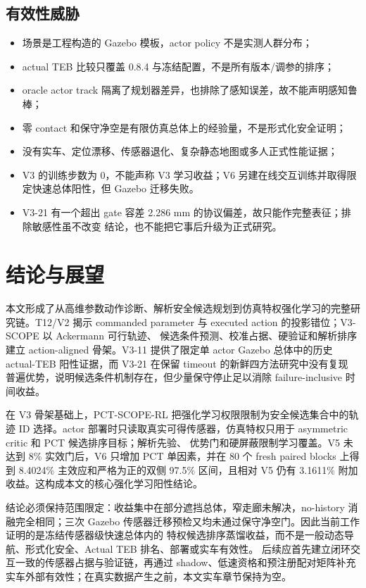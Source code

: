 \documentclass[12pt,a4paper,oneside]{report}
\begin{document}
\section{有效性威胁}
\begin{itemize}
  \item 场景是工程构造的 Gazebo 模板，actor policy 不是实测人群分布；
  \item actual TEB 比较只覆盖 0.8.4 与冻结配置，不是所有版本/调参的排序；
  \item oracle actor track 隔离了规划器差异，也排除了感知误差，故不能声明感知鲁棒；
  \item 零 contact 和保守净空是有限仿真总体上的经验量，不是形式化安全证明；
  \item 没有实车、定位漂移、传感器退化、复杂静态地图或多人正式性能证据；
  \item V3 的训练步数为 0，不能声称 V3 学习收益；V6 另建在线交互训练并取得限定快速总体阳性，但 Gazebo 迁移失败。
  \item V3-21 有一个超出 gate 容差 2.286 mm 的协议偏差，故只能作完整表征；排除敏感性虽不改变
  结论，也不能把它事后升级为正式研究。
\end{itemize}

\chapter{结论与展望}
本文形成了从高维参数动作诊断、解析安全候选规划到仿真特权强化学习的完整研究链。T12/V2
揭示 commanded parameter 与 executed action 的投影错位；V3-SCOPE 以 Ackermann 可行轨迹、
候选条件预测、校准占据、硬验证和解析排序建立 action-aligned 骨架。V3-11 提供了限定单 actor
Gazebo 总体中的历史 actual-TEB 阳性证据，而 V3-21 在保留 timeout 的新鲜四方法研究中没有复现
普遍优势，说明候选条件机制存在，但少量保守停止足以消除 failure-inclusive 时间收益。

在 V3 骨架基础上，PCT-SCOPE-RL 把强化学习权限限制为安全候选集合中的轨迹 ID 选择。actor
部署时只读取真实可得传感器，仿真特权只用于 asymmetric critic 和 PCT 候选排序目标；解析先验、
优势门和硬屏蔽限制学习覆盖。V5 未达到 8\% 实效门后，V6 只增加 PCT 单因素，并在 80 个 fresh
paired blocks 上得到 8.4024\% 主效应和严格为正的双侧 97.5\% 区间，且相对 V5 仍有 3.1611\%
附加收益。这构成本文的核心强化学习阳性结论。

结论必须保持范围限定：收益集中在部分遮挡总体，窄走廊未解决，no-history 消融完全相同；三次
Gazebo 传感器迁移预检又均未通过保守净空门。因此当前工作证明的是冻结传感器级快速总体内的
特权候选排序蒸馏收益，而不是一般动态导航、形式化安全、Actual TEB 排名、部署或实车有效性。
后续应首先建立闭环交互一致的传感器占据与验证链，再通过 shadow、低速资格和预注册配对矩阵补充
实车外部有效性；在真实数据产生之前，本文实车章节保持为空。
\end{document}
